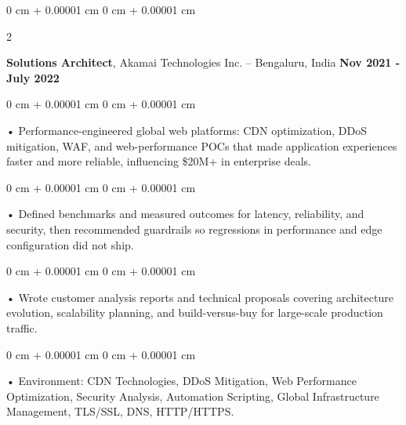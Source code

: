 \documentclass[10pt, letterpaper]{article}
\newenvironment{onecolentry}{
    \begin{adjustwidth}{
        0 cm + 0.00001 cm
    }{
        0 cm + 0.00001 cm
    }
}{
    \end{adjustwidth}
} %
\newenvironment{twocolentry}[2][]{
    \onecolentry
    \def\secondColumn{#2}
    \setcolumnwidth{\fill, 4.5 cm}
    \begin{paracol}{2}
}{
    \switchcolumn \raggedleft \secondColumn
    \end{paracol}
    \endonecolentry
} %
\begin{document}
        \begin{twocolentry}{
            \textbf{Nov 2021 - July 2022}
        }
            \textbf{Solutions Architect}, Akamai Technologies Inc. -- Bengaluru, India \end{twocolentry}
        \begin{onecolentry}
            • Performance-engineered global web platforms: CDN optimization, DDoS mitigation, WAF, and web-performance POCs that made application experiences faster and more reliable, influencing \$20M+ in enterprise deals.
        \end{onecolentry}
        \begin{onecolentry}
            • Defined benchmarks and measured outcomes for latency, reliability, and security, then recommended guardrails so regressions in performance and edge configuration did not ship.
        \end{onecolentry}
        \begin{onecolentry}
             • Wrote customer analysis reports and technical proposals covering architecture evolution, scalability planning, and build-versus-buy for large-scale production traffic.
        \end{onecolentry}
        \begin{onecolentry}
             • Environment: CDN Technologies, DDoS Mitigation, Web Performance Optimization, Security Analysis, Automation Scripting, Global Infrastructure Management, TLS/SSL, DNS, HTTP/HTTPS.
        \end{onecolentry}
\end{document}
